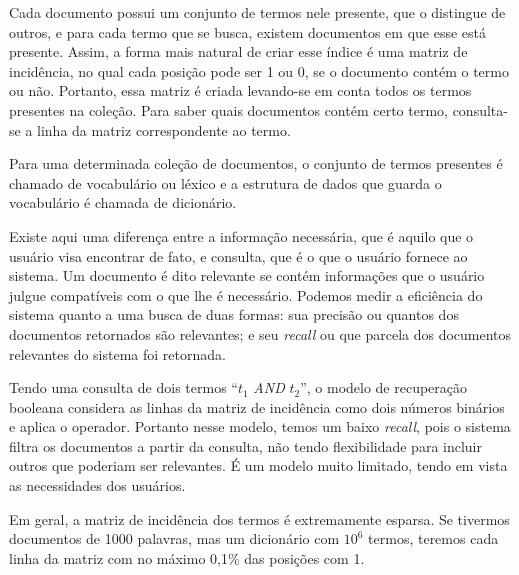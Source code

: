 Cada documento possui um conjunto de termos nele presente, que o distingue de outros, e para cada termo que se busca, existem documentos em que esse está presente. Assim, a forma mais natural de criar esse índice é uma matriz de incidência, no qual cada posição pode ser 1 ou 0, se o documento contém o termo ou não. Portanto, essa matriz é criada levando-se em conta todos os termos presentes na coleção. Para saber quais documentos contém certo termo, consulta-se a linha da matriz correspondente ao termo.

Para uma determinada coleção de documentos, o conjunto de termos presentes é chamado de vocabulário ou léxico e a estrutura de dados que guarda o vocabulário é chamada de dicionário.

Existe aqui uma diferença entre a informação necessária, que é aquilo que o usuário visa encontrar de fato, e consulta, que é o que o usuário fornece ao sistema. Um documento é dito relevante se contém informações que o usuário julgue compatíveis com o que lhe é necessário. Podemos medir a eficiência do sistema quanto a uma busca de duas formas: sua precisão ou quantos dos documentos retornados são relevantes; e seu \emph{recall} ou que parcela dos documentos relevantes do sistema foi retornada.

Tendo uma consulta de dois termos ``$t_{1}$ \emph{AND} $t_{2}$'', o modelo de recuperação booleana considera as linhas da matriz de incidência como dois números binários e aplica o operador. Portanto nesse modelo, temos um baixo \emph{recall}, pois o sistema filtra os documentos a partir da consulta, não tendo flexibilidade para incluir outros que poderiam ser relevantes. É um modelo muito limitado, tendo em vista as necessidades dos usuários.

Em geral, a matriz de incidência dos termos é extremamente esparsa. Se tivermos documentos de 1000 palavras, mas um dicionário com $10^{6}$ termos, teremos cada linha da matriz com no máximo 0,1\% das posições com 1. 

